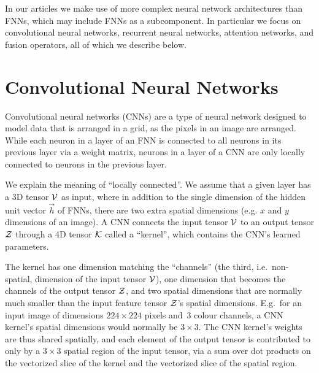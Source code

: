 In our articles we make use of more complex neural network architectures than
FNNs, which may include FNNs as a subcomponent.
In particular we focus on convolutional neural networks, recurrent neural
networks, attention networks, and fusion operators, all of which we describe
below.


\section{Convolutional Neural Networks}

Convolutional neural networks (CNNs) are a type of neural network designed to
model data that is arranged in a grid, as the pixels in an image are arranged.
While each neuron in a layer of an FNN is connected to all neurons in its
previous layer via a weight matrix, neurons in a layer of a CNN are only
locally connected to neurons in the previous layer.

We explain the meaning of ``locally connected''. We assume that a given layer
has a 3D tensor $\mathcal{V}$ as input, where in addition to the single dimension
of the hidden unit vector $\vec{h}$ of FNNs, there are two extra spatial
dimensions (e.g. $x$ and $y$ dimensions of an image).  A CNN connects the input
tensor $\mathcal{V}$ to an output tensor $\mathcal{Z}$ through a 4D tensor
$\mathcal{K}$ called a ``kernel'', which contains the CNN's learned parameters.

The kernel has one dimension matching the ``channels'' (the third, i.e.\
non-spatial, dimension of the input tensor $\mathcal{V}$), one dimension that
becomes the channels of the output tensor $\mathcal{Z}$, and two spatial
dimensions that are normally much smaller than the input feature tensor
$\mathcal{Z}$'s spatial dimensions. E.g.\ for an input image of dimensions $224
\times 224$ pixels and~\num{3} colour channels, a CNN kernel's spatial
dimensions would normally be $3 \times 3$. The CNN kernel's weights are thus
shared spatially, and each element of the output tensor is contributed to only
by a $3 \times 3$ spatial region of the input tensor, via a sum over dot
products on the vectorized slice of the kernel and the vectorized slice of the
spatial region.

